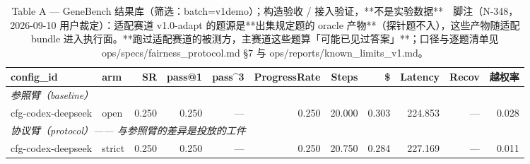 \begin{table}[t]
\centering
\caption{Table A — GeneBench 结果库（筛选：batch=v1demo）；构造验收 / 接入验证，**不是实验数据**　脚注（N-348，2026-09-10 用户裁定）：适配赛道 v1.0-adapt 的题源是**出集规定题的 oracle 产物**（探针题不入），这些产物随适配 bundle 进入执行面。**跑过适配赛道的被测方，主赛道这些题算「可能已见过答案」**；口径与逐题清单见 ops/specs/fairness\_protocol.md §7 与 ops/reports/known\_limits\_v1.md。}
\label{tab:a-v1demo}
\begin{tabular}{llrrrrrrrrr}
\toprule
config\_id & arm & SR & pass@1 & pass\^{}3 & ProgressRate & Steps & \$ & Latency & Recov & 越权率 \\
\midrule
\multicolumn{11}{l}{\textit{参照臂（baseline）}} \\
cfg-codex-deepseek & open & 0.250 & 0.250 & --- & 0.250 & 20.000 & 0.303 & 224.853 & --- & 0.028 \\
\midrule
\multicolumn{11}{l}{\textit{协议臂（protocol）—— 与参照臂的差异是投放的工件}} \\
cfg-codex-deepseek & strict & 0.250 & 0.250 & --- & 0.250 & 20.750 & 0.284 & 227.169 & --- & 0.011 \\
\bottomrule
\end{tabular}
\end{table}

